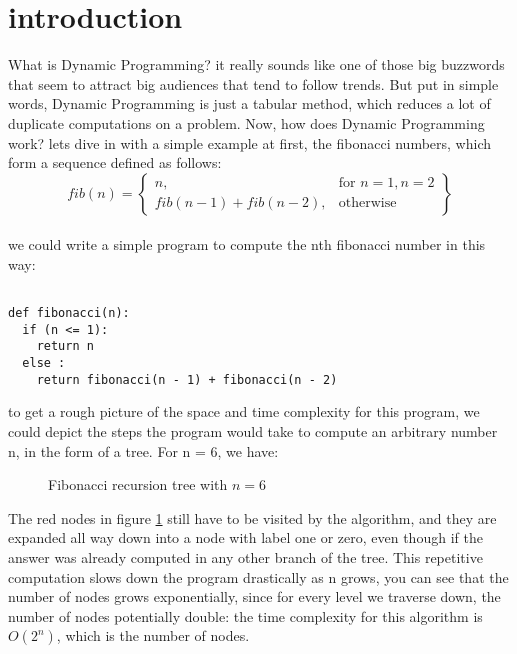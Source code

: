 
 
 \section{introduction}


What is Dynamic Programming? it really sounds like one of those big buzzwords that seem to
attract big audiences that tend to follow trends. But put in simple words, Dynamic Programming is just a tabular method, 
which reduces a lot of duplicate computations on a problem. Now, how does Dynamic Programming work? lets dive in with a simple example at first, the fibonacci numbers,
which form a sequence defined as follows:
  \\
  \[
    fib(n) = \left\{\begin{array}{lr}
      n, & \text{for } n = 1, n = 2\\
      fib(n-1) + fib(n-2), & \text{otherwise}
      \end{array}\right\}
  \]
  \\

we could write a simple program to compute the nth fibonacci number in this way:

\begin{verbatim}

def fibonacci(n):
  if (n <= 1):
    return n
  else :
    return fibonacci(n - 1) + fibonacci(n - 2)

\end{verbatim}


to get a rough picture of the space and time complexity for this program, we could depict the steps
the program would take to compute an arbitrary number n, in the form of a tree. For n = 6, we have:


\begin{figure}[ht]
  \centering
  \caption{Fibonacci recursion tree with $n = 6$}
  \label{fig:fib1}
\end{figure}

The red nodes in figure \ref{fig:fib1} still have to be visited by the algorithm, and they are expanded all 
way down into a node with label one or zero, even though if the answer was already computed in any other 
branch of the tree. This repetitive computation slows down the program drastically as n grows,
you can see that the number of nodes grows exponentially, since for every level we traverse down,
the number of nodes potentially double: the time complexity for this algorithm is $O(2^n)$, which is 
the number of nodes.

